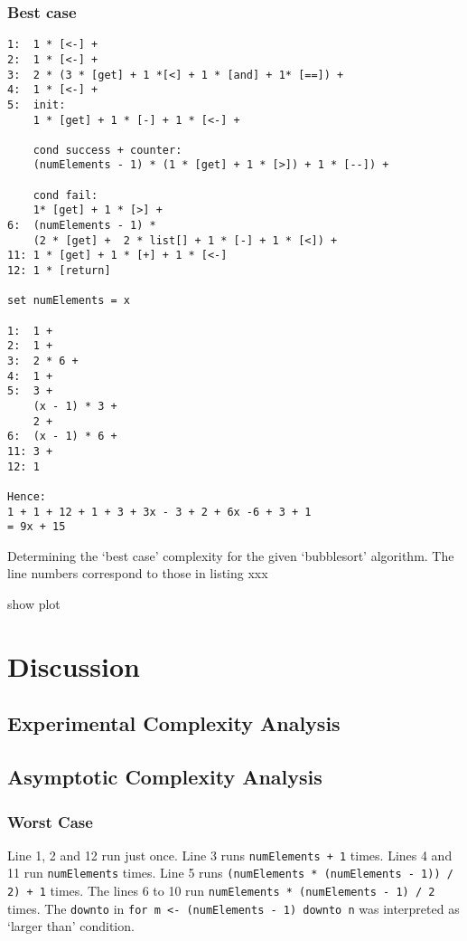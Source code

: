 \documentclass[a4paper,11pt,twoside]{article}
\begin{document}
\subsubsection{Best case}

\begin{listing}\label{ls:best}
\begin{verbatim}
1:  1 * [<-] +
2:  1 * [<-] +
3:  2 * (3 * [get] + 1 *[<] + 1 * [and] + 1* [==]) +
4:  1 * [<-] +
5:  init:
    1 * [get] + 1 * [-] + 1 * [<-] +

    cond success + counter:
    (numElements - 1) * (1 * [get] + 1 * [>]) + 1 * [--]) +
    
    cond fail:
    1* [get] + 1 * [>] + 
6:  (numElements - 1) * 
    (2 * [get] +  2 * list[] + 1 * [-] + 1 * [<]) +
11: 1 * [get] + 1 * [+] + 1 * [<-]
12: 1 * [return]

set numElements = x

1:  1 +
2:  1 +
3:  2 * 6 +
4:  1 +
5:  3 + 
    (x - 1) * 3 +
    2 +
6:  (x - 1) * 6 +
11: 3 +
12: 1 

Hence:
1 + 1 + 12 + 1 + 3 + 3x - 3 + 2 + 6x -6 + 3 + 1
= 9x + 15

\end{verbatim}
\caption{Determining the `best case' complexity for the given
  `bubblesort' algorithm. The line numbers correspond to those in
  listing xxx}
\end{listing}

show plot

\section{Discussion}
\subsection{Experimental Complexity Analysis}

\subsection{Asymptotic Complexity Analysis}
\subsubsection{Worst Case}
Line 1, 2 and 12 run just once. Line 3 runs \verb!numElements + 1! times. Lines
4 and 11 run \verb!numElements! times. Line 5 runs
\verb!(numElements * (numElements - 1)) / 2) + 1! 
times. The lines 6 to 10 run \verb!numElements * (numElements - 1) / 2! times. 
The \verb!downto! in \verb!for m <- (numElements - 1) downto n! was
interpreted as `larger than' condition.



\end{document}
